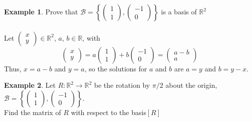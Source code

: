 \documentclass[letterpaper,12pt]{article}
\theoremstyle{definition}
\newtheorem*{example}{Example}
\newcommand{\set}[1]{\left\{ #1 \right\}}
\begin{document}
\begin{example}
Prove that $\mathcal{B} = \set{\begin{pmatrix} 1 \\ 1 \end{pmatrix}, \begin{pmatrix} -1 \\ 0 \end{pmatrix}}$ is a basis of $\mathbb{R}^2$
\\ \\ Let $\begin{pmatrix} x \\ y \end{pmatrix} \in \mathbb{R}^2$, $a$, $b \in \mathbb{R}$, with
\begin{equation*}
    \begin{pmatrix} x \\ y \end{pmatrix} = a \begin{pmatrix} 1 \\ 1 \end{pmatrix} + b \begin{pmatrix} -1 \\ 0 \end{pmatrix} = \begin{pmatrix} a - b \\ a \end{pmatrix}
\end{equation*}
Thus, $x = a - b$ and $y = a$, so the solutions for $a$ and $b$ are $a = y$ and $b = y - x$.
\end{example}

\begin{example}
Let $R: \mathbb{R}^2 \rightarrow \mathbb{R}^2$ be the rotation by $\pi/2$ about the origin, $\mathcal{B} = \set{\begin{pmatrix} 1 \\ 1 \end{pmatrix}, \begin{pmatrix} -1 \\ 0 \end{pmatrix}}$.
\\ Find the matrix of $R$ with respect to the basis$[R]$
\end{example}
\end{document}
